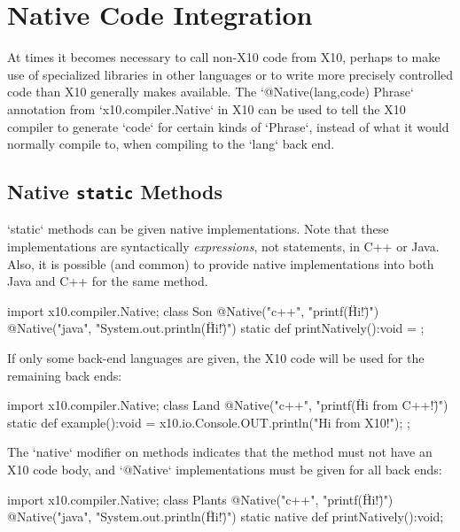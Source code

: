 \chapter{Native Code Integration}
\label{NativeCode}

At times it becomes necessary to call non-X10 code from X10, perhaps to make
use of specialized libraries in other languages or to write more precisely
controlled code than X10 generally makes available. The
\xcd`@Native(lang,code) Phrase` annotation from \xcd`x10.compiler.Native` in
X10 can be used to tell the X10 compiler to generate \xcd`code` for certain
kinds of \xcd`Phrase`, instead of what it would normally compile to, when
compiling to the \xcd`lang` back end.


\section{Native {\tt static} Methods}

\xcd`static` methods can be given native implementations.  Note that these
implementations are syntactically {\em expressions}, not statements, in C++ or
Java.   Also, it is possible (and common) to provide native implementations
into both Java and C++ for the same method.
\begin{xten}
import x10.compiler.Native;
class Son {
  @Native("c++", "printf(\"Hi!\")")
  @Native("java", "System.out.println(\"Hi!\")")
  static def printNatively():void = {};
}
\end{xten}
%

If only some back-end languages are given, the X10 code will be used for the
remaining back ends: 
\begin{xten}
import x10.compiler.Native;
class Land {
  @Native("c++", "printf(\"Hi from C++!\")")
  static def example():void = {
    x10.io.Console.OUT.println("Hi from X10!");
  };
}
\end{xten}
%

The \xcd`native` modifier on methods indicates that the method must not have
an X10 code body, and \xcd`@Native` implementations must be given for all back
ends:
\begin{xten}
import x10.compiler.Native;
class Plants {
  @Native("c++", "printf(\"Hi!\")")
  @Native("java", "System.out.println(\"Hi!\")")
  static native def printNatively():void;
}
\end{xten}
%


